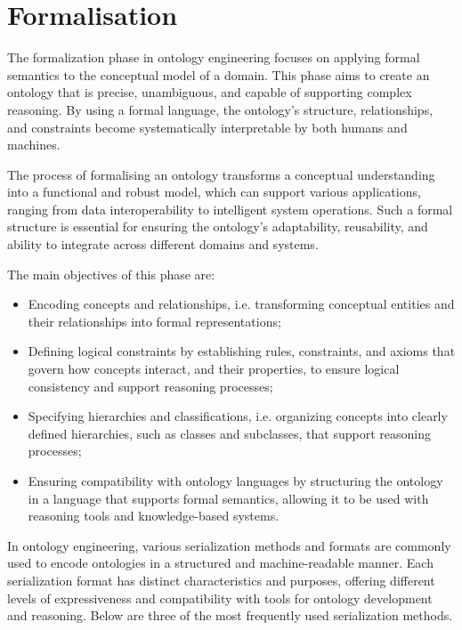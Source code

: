 \chapter{Formalisation}\label{ch: Formalisation}

The formalization phase in ontology engineering focuses on applying formal semantics to the conceptual model of a domain. This phase aims to create an ontology that is precise, unambiguous, and capable of supporting complex reasoning. By using a formal language, the ontology’s structure, relationships, and constraints become systematically interpretable by both humans and machines.

The process of formalising an ontology transforms a conceptual understanding into a functional and robust model, which can support various applications, ranging from data interoperability to intelligent system operations. Such a formal structure is essential for ensuring the ontology’s adaptability, reusability, and ability to integrate across different domains and systems.

The main objectives of this phase are:

\begin{itemize}
    \item Encoding concepts and relationships, i.e. transforming conceptual entities and their relationships into formal representations;
    
    \item Defining logical constraints by establishing rules, constraints, and axioms that govern how concepts interact, and their properties, to ensure logical consistency and support reasoning processes;
    
    \item Specifying hierarchies and classifications, i.e. organizing concepts into clearly defined hierarchies, such as classes and subclasses, that support reasoning processes;
    
    \item Ensuring compatibility with ontology languages by structuring the ontology in a language that supports formal semantics, allowing it to be used with reasoning tools and knowledge-based systems.
\end{itemize}

In ontology engineering, various serialization methods and formats are commonly used to encode ontologies in a structured and machine-readable manner. Each serialization format has distinct characteristics and purposes, offering different levels of expressiveness and compatibility with tools for ontology development and reasoning. Below are three of the most frequently used serialization methods.

